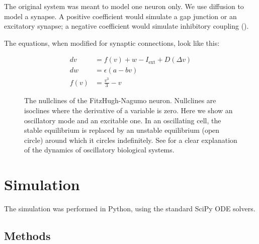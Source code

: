 \documentclass[
    11pt,
]{article}
\begin{document}
The original system was meant to model one neuron only.  We use diffusion to
model a synapse. A positive coefficient would simulate a gap junction or
an excitatory synapse; a negative coefficient would simulate inhibitory
coupling (\citet{collins1994}).


The equations, when modified for synaptic connections, look like this:

\begin{equation}
    \label{eq: fhnd}
    \begin{aligned}
        dv   &= f(v) + w - I_\mathrm{ext} + D(Δv)\\ %
        dw   &= ϵ(a - bv)\\
        f(v) &= \frac{v^3}{3} - v
    \end{aligned}
\end{equation}

\begin{figure}[h!]
    \label{fig: fhn_dynamics}
    \centering
    \caption{The nullclines of the FitzHugh-Nagumo neuron.  Nullclines are isoclines where the derivative of a variable is zero.  Here we show an oscillatory mode and an excitable one.  In an oscillating cell, the stable equilibrium is replaced by an unstable equilibrium (open circle) around which it circles indefinitely.  See \citet{parsons2018} for a clear explanation of the dynamics of oscillatory biological systems.}
\end{figure} %



\section{Simulation}

The simulation was performed in Python, using the standard SciPy ODE solvers. %

\subsection{Methods}
\end{document}
